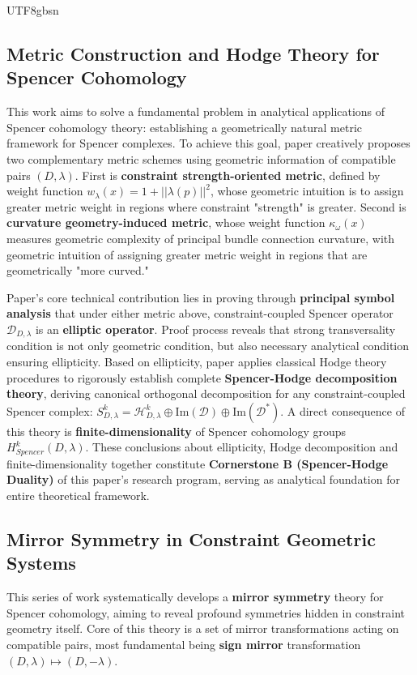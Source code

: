 \documentclass[a4paper,12pt]{extarticle}
\theoremstyle{definition}
\begin{document}
\begin{CJK}{UTF8}{gbsn}
\subsection{Metric Construction and Hodge Theory for Spencer Cohomology \cite{zheng2025constructing}}
\label{subsec:roadmap_constructing}
This work \cite{zheng2025constructing} aims to solve a fundamental problem in analytical applications of Spencer cohomology theory: establishing a geometrically natural metric framework for Spencer complexes. To achieve this goal, paper creatively proposes two complementary metric schemes using geometric information of compatible pairs $(D, \lambda)$. First is \textbf{constraint strength-oriented metric}, defined by weight function $w_{\lambda}(x) = 1 + ||\lambda(p)||^2$, whose geometric intuition is to assign greater metric weight in regions where constraint "strength" is greater. Second is \textbf{curvature geometry-induced metric}, whose weight function $\kappa_{\omega}(x)$ measures geometric complexity of principal bundle connection curvature, with geometric intuition of assigning greater metric weight in regions that are geometrically "more curved."

Paper's core technical contribution lies in proving through \textbf{principal symbol analysis} that under either metric above, constraint-coupled Spencer operator $\mathcal{D}_{D,\lambda}$ is an \textbf{elliptic operator}. Proof process reveals that strong transversality condition is not only geometric condition, but also necessary analytical condition ensuring ellipticity. Based on ellipticity, paper applies classical Hodge theory procedures to rigorously establish complete \textbf{Spencer-Hodge decomposition theory}, deriving canonical orthogonal decomposition for any constraint-coupled Spencer complex: $S_{D,\lambda}^k = \mathcal{H}_{D,\lambda}^k \oplus \mathrm{Im}(\mathcal{D}) \oplus \mathrm{Im}(\mathcal{D}^*)$. A direct consequence of this theory is \textbf{finite-dimensionality} of Spencer cohomology groups $H_{Spencer}^k(D, \lambda)$. These conclusions about ellipticity, Hodge decomposition and finite-dimensionality together constitute \textbf{Cornerstone B (Spencer-Hodge Duality)} of this paper's research program, serving as analytical foundation for entire theoretical framework.

\subsection{Mirror Symmetry in Constraint Geometric Systems \cite{zheng2025mirror}}
\label{subsec:roadmap_mirror}
This series of work \cite{zheng2025mirror} systematically develops a \textbf{mirror symmetry} theory for Spencer cohomology, aiming to reveal profound symmetries hidden in constraint geometry itself. Core of this theory is a set of mirror transformations acting on compatible pairs, most fundamental being \textbf{sign mirror} transformation $(D, \lambda) \mapsto (D, -\lambda)$.


\end{CJK}
\end{document}
